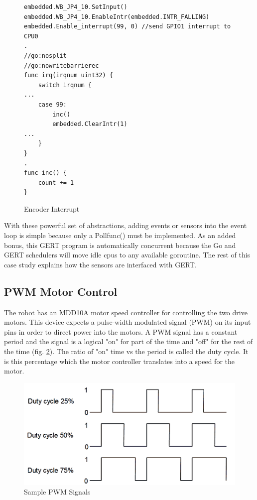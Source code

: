 \begin{figure}[!h]
\begin{center}
\begin{lstlisting}
embedded.WB_JP4_10.SetInput()
embedded.WB_JP4_10.EnableIntr(embedded.INTR_FALLING)
embedded.Enable_interrupt(99, 0) //send GPIO1 interrupt to CPU0
.
//go:nosplit
//go:nowritebarrierec
func irq(irqnum uint32) {
	switch irqnum {
...
	case 99:
		inc()
		embedded.ClearIntr(1)
...
	}
}
.
func inc() {
	count += 1
}

\end{lstlisting}
\end{center}
  \caption{Encoder Interrupt} \label{fig:encoder}
\end{figure}

With these powerful set of abstractions, adding events or sensors into the event loop
is simple because only a Pollfunc() must be implemented. As an added bonus, this
GERT program is automatically concurrent because the Go and GERT schedulers will
move idle cpus to any available goroutine. The rest of this case study explains how the sensors
are interfaced with GERT.


\subsection{PWM Motor Control}
The robot has an MDD10A motor speed controller for controlling the two drive motors. This device
expects a pulse-width modulated signal (PWM) on its input pins in order to direct power into the
motors. A PWM signal has a constant period and the signal is a logical "on" for part of the time
and "off" for the rest of the time (fig. \ref{fig:pwm}). The ratio of "on" time vs the period is called the duty cycle.
It is this percentage which the motor controller translates into a speed for the motor.

\begin{figure}[h]
\begin{center}
  \includegraphics[scale=0.5]{pwm}
\end{center}
  \caption{Sample PWM Signals} \label{fig:pwm}
\end{figure}


